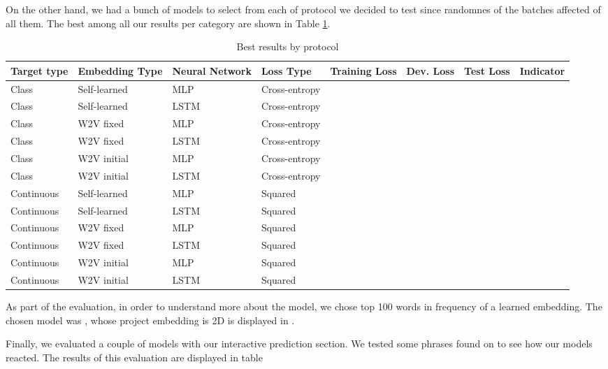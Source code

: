 \documentclass[11pt,letterpaper]{article}
\begin{document}
On the other hand, we had a bunch of models to select from each of protocol we decided to test since randomnes of the batches affected of all them. The best among all our results per category are shown in Table \ref{table:summary-results}. 
\begin{table}[ht!]
\centering
\caption{Best results by protocol}
\label{table:summary-results}
\scalebox{0.8} 
{\begin{tabular}{|l|l|l|l|l|l|l|l|}
\hline
\textbf{Target type} & \textbf{Embedding Type} & \textbf{Neural Network} & \textbf{Loss Type} & \textbf{Training Loss} & \textbf{Dev. Loss} & \textbf{Test Loss} & \textbf{Indicator} \\ \hline\hline
Class & Self-learned & MLP & Cross-entropy &  &  &  &  \\ \hline
Class & Self-learned & LSTM & Cross-entropy &  &  &  &  \\ \hline
Class & W2V fixed & MLP & Cross-entropy &  &  &  &  \\ \hline
Class & W2V fixed & LSTM & Cross-entropy &  &  &  &  \\ \hline
Class & W2V initial & MLP & Cross-entropy &  &  &  &  \\ \hline
Class & W2V initial & LSTM & Cross-entropy &  &  &  &  \\ \hline
Continuous & Self-learned & MLP & Squared &  &  &  &  \\ \hline
Continuous & Self-learned & LSTM & Squared &  &  &  &  \\ \hline
Continuous & W2V fixed & MLP & Squared &  &  &  &  \\ \hline
Continuous & W2V fixed & LSTM & Squared &  &  &  &  \\ \hline
Continuous & W2V initial & MLP & Squared &  &  &  &  \\ \hline
Continuous & W2V initial & LSTM & Squared &  &  &  &  \\ \hline \hline
\end{tabular}}
\end{table}

As part of the evaluation, in order to understand more about the model, we chose top 100 words in frequency of a learned embedding. The chosen model was , whose project embedding is 2D is displayed in . 

Finally, we evaluated a couple of models with our interactive prediction section. We tested some phrases found on \cite{jurafsky2014language} to see how our models reacted.  The results of this evaluation are displayed in table
\end{document}

